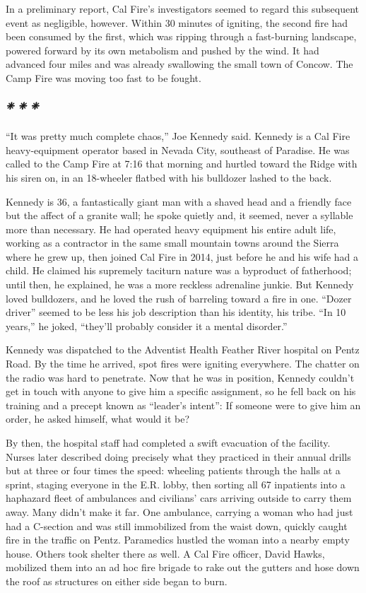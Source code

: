 In a preliminary report, Cal Fire's investigators seemed to regard this
subsequent event as negligible, however. Within 30 minutes of igniting,
the second fire had been consumed by the first, which was ripping
through a fast-burning landscape, powered forward by its own metabolism
and pushed by the wind. It had advanced four miles and was already
swallowing the small town of Concow. The Camp Fire was moving too fast
to be fought.

\hypertarget{---5}{%
\subparagraph{❈ ❈ ❈}\label{---5}}

``It was pretty much complete chaos,'' Joe Kennedy said. Kennedy is a
Cal Fire heavy-equipment operator based in Nevada City, southeast of
Paradise. He was called to the Camp Fire at 7:16 that morning and
hurtled toward the Ridge with his siren on, in an 18-wheeler flatbed
with his bulldozer lashed to the back.

Kennedy is 36, a fantastically giant man with a shaved head and a
friendly face but the affect of a granite wall; he spoke quietly and, it
seemed, never a syllable more than necessary. He had operated heavy
equipment his entire adult life, working as a contractor in the same
small mountain towns around the Sierra where he grew up, then joined Cal
Fire in 2014, just before he and his wife had a child. He claimed his
supremely taciturn nature was a byproduct of fatherhood; until then, he
explained, he was a more reckless adrenaline junkie. But Kennedy loved
bulldozers, and he loved the rush of barreling toward a fire in one.
``Dozer driver'' seemed to be less his job description than his
identity, his tribe. ``In 10 years,'' he joked, ``they'll probably
consider it a mental disorder.''

Kennedy was dispatched to the Adventist Health Feather River hospital on
Pentz Road. By the time he arrived, spot fires were igniting everywhere.
The chatter on the radio was hard to penetrate. Now that he was in
position, Kennedy couldn't get in touch with anyone to give him a
specific assignment, so he fell back on his training and a precept known
as ``leader's intent'': If someone were to give him an order, he asked
himself, what would it be?

By then, the hospital staff had completed a swift evacuation of the
facility. Nurses later described doing precisely what they practiced in
their annual drills but at three or four times the speed: wheeling
patients through the halls at a sprint, staging everyone in the E.R.
lobby, then sorting all 67 inpatients into a haphazard fleet of
ambulances and civilians' cars arriving outside to carry them away. Many
didn't make it far. One ambulance, carrying a woman who had just had a
C-section and was still immobilized from the waist down, quickly caught
fire in the traffic on Pentz. Paramedics hustled the woman into a nearby
empty house. Others took shelter there as well. A Cal Fire officer,
David Hawks, mobilized them into an ad hoc fire brigade to rake out the
gutters and hose down the roof as structures on either side began to
burn.

